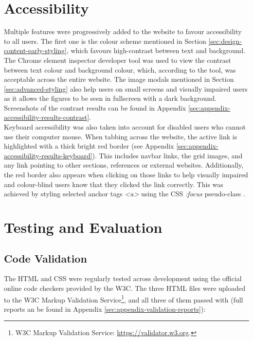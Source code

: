 \documentclass[letterpaper,12pt]{article}
\begin{document}

\section{Accessibility}
\label{sec:accessibility}

Multiple features were progressively added to the website to favour accessibility to all users. The first one is the colour scheme mentioned in Section \ref{sec:design-content-early-styling}, which favours high-contrast between text and background. The Chrome element inspector developer tool was used to view the contrast between text colour and background colour, which, according to the tool, was acceptable across the entire website. The image modals mentioned in Section \ref{sec:advanced-styling} also help users on small screens and visually impaired users as it allows the figures to be seen in fullscreen with a dark background. Screenshots of the contrast results can be found in Appendix \ref{sec:appendix-accessibility-results-contrast}.\\

Keyboard accessibility was also taken into account for disabled users who cannot use their computer mouse. When tabbing across the website, the active link is highlighted with a thick bright red border (see Appendix \ref{sec:appendix-accessibility-results-keyboard}). This includes navbar links, the grid images, and any link pointing to other sections, references or external websites. Additionally, the red border also appears when clicking on those links to help visually impaired and colour-blind users know that they clicked the link correctly. This was achieved by styling selected anchor tags \textit{\textless a\textgreater} using the CSS \textit{:focus} pseudo-class \cite{css-focus}.


\section{Testing and Evaluation}
\label{sec:testing-evaluation}

\subsection{Code Validation}

The HTML and CSS were regularly tested across development using the official online code checkers provided by the W3C. The three HTML files were uploaded to the W3C Markup Validation Service\footnote{W3C Markup Validation Service: \url{https://validator.w3.org}.}, and all three of them passed with (full reports an be found in Appendix \ref{sec:appendix-validation-reports}):
\end{document}
